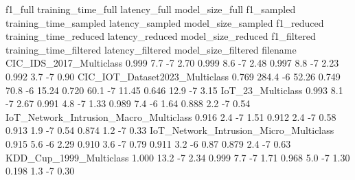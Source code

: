                                                                     f1_full training_time_full latency_full model_size_full f1_sampled training_time_sampled latency_sampled model_size_sampled f1_reduced training_time_reduced latency_reduced model_size_reduced f1_filtered training_time_filtered latency_filtered model_size_filtered
filename                                                                                                                                                                                                                                                                                                                                   
CIC_IDS_2017_Multiclass                                               0.999                7.7           -7            2.70      0.999                   8.6              -7               2.48      0.997                   8.8              -7               2.23       0.992                    3.7               -7                0.90
CIC_IOT_Dataset2023_Multiclass                                        0.769              284.4           -6           52.26      0.749                  70.8              -6              15.24      0.720                  60.1              -7              11.45       0.646                   12.9               -7                3.15
IoT_23_Multiclass                                                     0.993                8.1           -7            2.67      0.991                   4.8              -7               1.33      0.989                   7.4              -6               1.64       0.888                    2.2               -7                0.54
IoT_Network_Intrusion_Macro_Multiclass                                0.916                2.4           -7            1.51      0.912                   2.4              -7               0.58      0.913                   1.9              -7               0.54       0.874                    1.2               -7                0.33
IoT_Network_Intrusion_Micro_Multiclass                                0.915                5.6           -6            2.29      0.910                   3.6              -7               0.79      0.911                   3.2              -6               0.87       0.879                    2.4               -7                0.63
KDD_Cup_1999_Multiclass                                               1.000               13.2           -7            2.34      0.999                   7.7              -7               1.71      0.968                   5.0              -7               1.30       0.198                    1.3               -7                0.30
